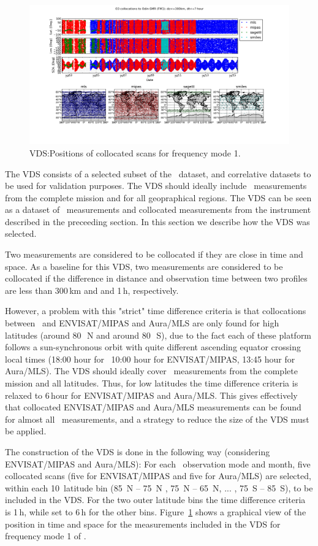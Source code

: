 \begin{figure}[t]
\centering
\includegraphics[width=17cm]{test_collocation_fm1.png}
\caption{VDS:Positions of collocated scans for frequency mode 1.}
\label{fig:vdsfm1}
\end{figure}


The VDS consists of a selected subset of the \smr\ dataset, and correlative
datasets to be used for validation purposes. 
The VDS should ideally include \smr\ measurements from    
the complete mission and for all geopraphical regions.
The VDS can be seen as a dataset of \smr\ measurements and
collocated measurements from the instrument described 
in the preceeding section. In this section we describe
how the VDS was selected.

 
Two measurements are considered to be collocated if they
are close in time and space. As a baseline for this VDS,
two measurements are considered to be collocated if the 
difference in distance and observation time between two profiles are 
less than 300\,km and and 1\,h, respectively.

However, a problem with this "strict" time difference criteria
is that collocations between \smr\ and  ENVISAT/MIPAS and Aura/MLS
are only found for high latitudes (around 80\,\degree\ N and around 80\,\degree\ S),
due to the fact each of these platform follows a sun-synchronous orbit
with quite different ascending equator crossing local times  
(18:00 hour for \smr\, 10:00 hour for ENVISAT/MIPAS,
 13:45 hour for Aura/MLS).
The VDS should ideally cover \smr\ measurements from    
the complete mission and all latitudes. 
Thus, for low latitudes the time difference criteria
is relaxed to 6\,hour for ENVISAT/MIPAS and Aura/MLS.
This gives effectively that collocated ENVISAT/MIPAS and Aura/MLS 
measurements can be found for almost all \smr\ measurements, and a strategy
to reduce the size of the VDS must be applied.

The construction of the VDS is done in the following way (considering ENVISAT/MIPAS and Aura/MLS):
For each \smr\ observation mode and month, five collocated scans
(five for ENVISAT/MIPAS and five for Aura/MLS)  
are selected, within each 10\degree\ latitude bin
(85\degree\ N -- 75\degree\ N , 75\degree\ N -- 65\degree\ N, ... , 75\degree\ S -- 85\degree\ S),
to be included in the VDS. For the two outer latitude bins the
time difference criteria is 1\,h, while set to 6\,h for the other bins.  
Figure~\ref{fig:vdsfm1} shows a graphical view of the position in
time and space for the measurements included in the VDS for
frequency mode 1 of \smr.   
